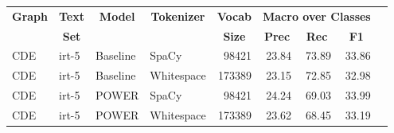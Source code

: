 \begin{tabular}{| l | l | l | l | r | r | r | r | r |}
    \hline

    \multicolumn{1}{|c|}{\textbf{Graph}} &
    \multicolumn{1}{|c|}{\textbf{Text}} &
    \multicolumn{1}{|c|}{\textbf{Model}} &
    \multicolumn{1}{|c|}{\textbf{Tokenizer}} &
    \multicolumn{1}{|c|}{\textbf{Vocab}} &
    \multicolumn{3}{|c|}{\textbf{Macro over Classes}} \\

    \multicolumn{1}{|c|}{} &
    \multicolumn{1}{|c|}{\textbf{Set}} &
    \multicolumn{1}{|c|}{} &
    \multicolumn{1}{|c|}{} &
    \multicolumn{1}{|c|}{\textbf{Size}} &
    \multicolumn{1}{|c|}{\textbf{Prec}} &
    \multicolumn{1}{|c|}{\textbf{Rec}} &
    \multicolumn{1}{|c|}{\textbf{F1}} \\

    \hline \hline

    CDE & irt-5 & Baseline & SpaCy & \num{98421} &
    23.84 & 73.89 & 33.86 \\

    CDE & irt-5 & Baseline & Whitespace & \num{173389} &
    23.15 & 72.85 & 32.98 \\

    CDE & irt-5 & POWER & SpaCy & \num{98421} & 
    24.24 & 69.03 & 33.99 \\

    CDE & irt-5 & POWER & Whitespace & \num{173389} &
    23.62 & 68.45 & 33.19 \\

    \hline
\end{tabular}
